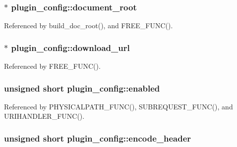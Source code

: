 \hypertarget{structplugin__config_a1e881c816cbb849873b45a53c6937f4c}{
\subsubsection[{document\-\_\-root}]{$\ast$ plugin\-\_\-config\-::document\-\_\-root}}\label{structplugin__config_a1e881c816cbb849873b45a53c6937f4c}


Referenced by build\-\_\-doc\-\_\-root(), and F\-R\-E\-E\-\_\-\-F\-U\-N\-C().

\hypertarget{structplugin__config_a0acdf0db3f564be268cdaa3b7efd0319}{
\subsubsection[{download\-\_\-url}]{$\ast$ plugin\-\_\-config\-::download\-\_\-url}}\label{structplugin__config_a0acdf0db3f564be268cdaa3b7efd0319}


Referenced by F\-R\-E\-E\-\_\-\-F\-U\-N\-C().

\hypertarget{structplugin__config_ad98acc4cd9c78b8fbdbf86b7329684f7}{
\subsubsection[{enabled}]{\setlength{\rightskip}{0pt plus 5cm}unsigned short plugin\-\_\-config\-::enabled}}\label{structplugin__config_ad98acc4cd9c78b8fbdbf86b7329684f7}


Referenced by P\-H\-Y\-S\-I\-C\-A\-L\-P\-A\-T\-H\-\_\-\-F\-U\-N\-C(), S\-U\-B\-R\-E\-Q\-U\-E\-S\-T\-\_\-\-F\-U\-N\-C(), and U\-R\-I\-H\-A\-N\-D\-L\-E\-R\-\_\-\-F\-U\-N\-C().

\hypertarget{structplugin__config_ad8d90f1da64ec97d46612c05cfcc4fb6}{
\subsubsection[{encode\-\_\-header}]{\setlength{\rightskip}{0pt plus 5cm}unsigned short plugin\-\_\-config\-::encode\-\_\-header}}\label{structplugin__config_ad8d90f1da64ec97d46612c05cfcc4fb6}


